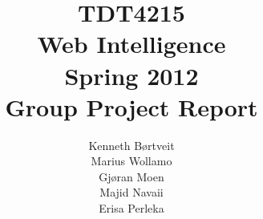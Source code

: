 \documentclass[a4paper, 11pt]{article}
\title{TDT4215 \\ Web Intelligence \\ Spring 2012 \\ Group Project Report}
\author{Kenneth Børtveit \\ Marius Wollamo \\ Gjøran Moen \\ Majid Navaii \\ Erisa Perleka}
\begin{document}
\maketitle
\pagebreak
\tableofcontents
\pagebreak
\end{document}
